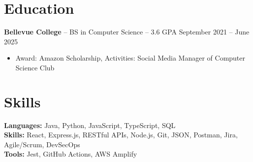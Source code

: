 \documentclass[11pt]{article}       %
\begin{document}

\vspace{-18.5pt}

\section*{Education}
\textbf{Bellevue College} -- BS in Computer Science -- 3.6 GPA \hfill September 2021 -- June 2025\\
\vspace{-9pt}
\begin{itemize}
  \item Award: Amazon Scholarship, Activities: Social Media Manager of Computer Science Club
\end{itemize}

\vspace{-18.5pt}

\section*{Skills}
\textbf{Languages:} Java, Python, JavaScript, TypeScript, SQL\\
\textbf{Skills:} React, Express.js, RESTful APIs, Node.js, Git, JSON, Postman, Jira, Agile/Scrum, DevSecOps\\
\textbf{Tools:} Jest, GitHub Actions, AWS Amplify

\vspace{-6.5pt}
\end{document}
